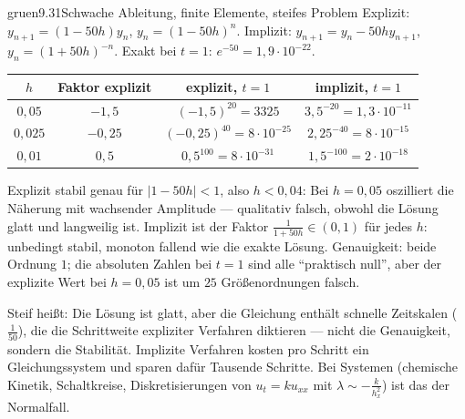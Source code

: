 \begin{loesungkarte}{gruen}{9.31}{Schwache Ableitung, finite Elemente, steifes Problem}
Explizit: $y_{n+1} = (1 - 50h)y_n$, $y_n = (1 - 50h)^{n}$. Implizit: $y_{n+1} = y_n - 50hy_{n+1}$, $y_n = (1 + 50h)^{-n}$. Exakt bei $t = 1$: $e^{-50} = 1{,}9\cdot10^{-22}$.
\begin{center}\small
\begin{tabular}{c|c|c|c}
$h$ & Faktor explizit & explizit, $t = 1$ & implizit, $t = 1$\\ \hline
$0{,}05$ & $-1{,}5$ & $(-1{,}5)^{20} = 3325$ & $3{,}5^{-20} = 1{,}3\cdot10^{-11}$\\
$0{,}025$ & $-0{,}25$ & $(-0{,}25)^{40} = 8\cdot10^{-25}$ & $2{,}25^{-40} = 8\cdot10^{-15}$\\
$0{,}01$ & $0{,}5$ & $0{,}5^{100} = 8\cdot10^{-31}$ & $1{,}5^{-100} = 2\cdot10^{-18}$
\end{tabular}
\end{center}
Explizit stabil genau für $|1 - 50h| < 1$, also $h < 0{,}04$: Bei $h = 0{,}05$ oszilliert die Näherung mit wachsender Amplitude --- qualitativ falsch, obwohl die Lösung glatt und langweilig ist. Implizit ist der Faktor $\frac1{1 + 50h}\in(0, 1)$ für jedes $h$: unbedingt stabil, monoton fallend wie die exakte Lösung. Genauigkeit: beide Ordnung $1$; die absoluten Zahlen bei $t = 1$ sind alle \enquote{praktisch null}, aber der explizite Wert bei $h = 0{,}05$ ist um $25$ Größenordnungen falsch.
\begin{mitnehmen}\kastentext
Steif heißt: Die Lösung ist glatt, aber die Gleichung enthält schnelle Zeitskalen ($\frac1{50}$), die die Schrittweite expliziter Verfahren diktieren --- nicht die Genauigkeit, sondern die Stabilität. Implizite Verfahren kosten pro Schritt ein Gleichungssystem und sparen dafür Tausende Schritte. Bei Systemen (chemische Kinetik, Schaltkreise, Diskretisierungen von $u_t = ku_{xx}$ mit $\lambda\sim-\frac k{h_x^{2}}$) ist das der Normalfall.
\end{mitnehmen}
\end{loesungkarte}

